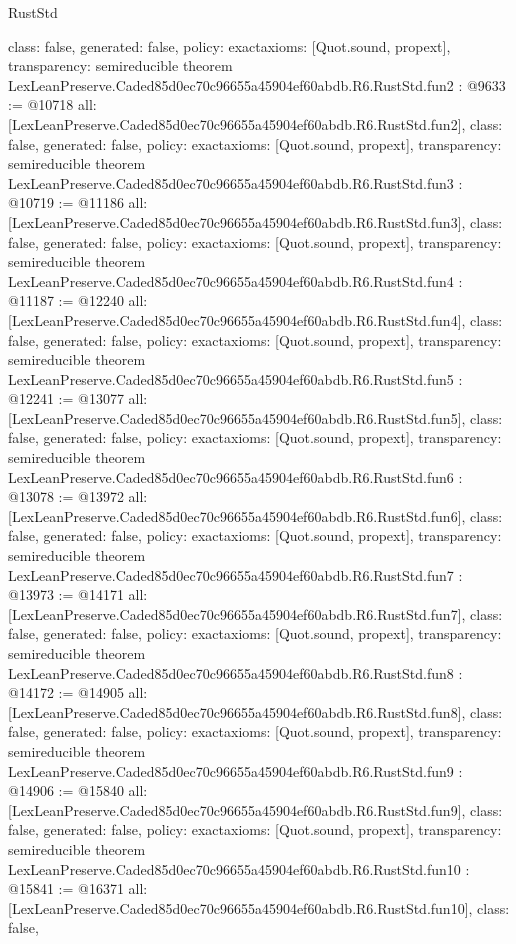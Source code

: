 \begin{lexlean}{RustStd}
\begin{coremodule}
{  class: false,
  generated: false,
  policy: exact{axioms: [Quot.sound, propext]},
  transparency: semireducible
}
theorem LexLeanPreserve.Caded85d0ec70c96655a45904ef60abdb.R6.RustStd.fun2 : @9633 := @10718 {
  all: [LexLeanPreserve.Caded85d0ec70c96655a45904ef60abdb.R6.RustStd.fun2],
  class: false,
  generated: false,
  policy: exact{axioms: [Quot.sound, propext]},
  transparency: semireducible
}
theorem LexLeanPreserve.Caded85d0ec70c96655a45904ef60abdb.R6.RustStd.fun3 : @10719 := @11186 {
  all: [LexLeanPreserve.Caded85d0ec70c96655a45904ef60abdb.R6.RustStd.fun3],
  class: false,
  generated: false,
  policy: exact{axioms: [Quot.sound, propext]},
  transparency: semireducible
}
theorem LexLeanPreserve.Caded85d0ec70c96655a45904ef60abdb.R6.RustStd.fun4 : @11187 := @12240 {
  all: [LexLeanPreserve.Caded85d0ec70c96655a45904ef60abdb.R6.RustStd.fun4],
  class: false,
  generated: false,
  policy: exact{axioms: [Quot.sound, propext]},
  transparency: semireducible
}
theorem LexLeanPreserve.Caded85d0ec70c96655a45904ef60abdb.R6.RustStd.fun5 : @12241 := @13077 {
  all: [LexLeanPreserve.Caded85d0ec70c96655a45904ef60abdb.R6.RustStd.fun5],
  class: false,
  generated: false,
  policy: exact{axioms: [Quot.sound, propext]},
  transparency: semireducible
}
theorem LexLeanPreserve.Caded85d0ec70c96655a45904ef60abdb.R6.RustStd.fun6 : @13078 := @13972 {
  all: [LexLeanPreserve.Caded85d0ec70c96655a45904ef60abdb.R6.RustStd.fun6],
  class: false,
  generated: false,
  policy: exact{axioms: [Quot.sound, propext]},
  transparency: semireducible
}
theorem LexLeanPreserve.Caded85d0ec70c96655a45904ef60abdb.R6.RustStd.fun7 : @13973 := @14171 {
  all: [LexLeanPreserve.Caded85d0ec70c96655a45904ef60abdb.R6.RustStd.fun7],
  class: false,
  generated: false,
  policy: exact{axioms: [Quot.sound, propext]},
  transparency: semireducible
}
theorem LexLeanPreserve.Caded85d0ec70c96655a45904ef60abdb.R6.RustStd.fun8 : @14172 := @14905 {
  all: [LexLeanPreserve.Caded85d0ec70c96655a45904ef60abdb.R6.RustStd.fun8],
  class: false,
  generated: false,
  policy: exact{axioms: [Quot.sound, propext]},
  transparency: semireducible
}
theorem LexLeanPreserve.Caded85d0ec70c96655a45904ef60abdb.R6.RustStd.fun9 : @14906 := @15840 {
  all: [LexLeanPreserve.Caded85d0ec70c96655a45904ef60abdb.R6.RustStd.fun9],
  class: false,
  generated: false,
  policy: exact{axioms: [Quot.sound, propext]},
  transparency: semireducible
}
theorem LexLeanPreserve.Caded85d0ec70c96655a45904ef60abdb.R6.RustStd.fun10 : @15841 := @16371 {
  all: [LexLeanPreserve.Caded85d0ec70c96655a45904ef60abdb.R6.RustStd.fun10],
  class: false,
}
\end{coremodule}
\end{lexlean}
